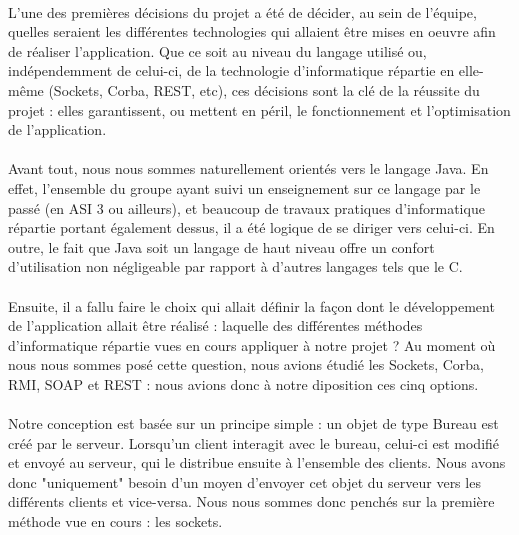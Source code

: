 \paragraph{}
L'une des premières décisions du projet a été de décider, au sein de l'équipe, quelles seraient les différentes technologies qui allaient être mises en oeuvre afin de réaliser l'application. Que ce soit au niveau du langage utilisé ou, indépendemment de celui-ci, de la technologie d'informatique répartie en elle-même (Sockets, Corba, REST, etc), ces décisions sont la clé de la réussite du projet : elles garantissent, ou mettent en péril, le fonctionnement et l'optimisation de l'application.

\paragraph{}
Avant tout, nous nous sommes naturellement orientés vers le langage Java. En effet, l'ensemble du groupe ayant suivi un enseignement sur ce langage par le passé (en ASI 3 ou ailleurs), et beaucoup de travaux pratiques d'informatique répartie portant également dessus, il a été logique de se diriger vers celui-ci. En outre, le fait que Java soit un langage de haut niveau offre un confort d'utilisation non négligeable par rapport à d'autres langages tels que le C.

\paragraph{}
Ensuite, il a fallu faire le choix qui allait définir la façon dont le développement de l'application allait être réalisé : laquelle des différentes méthodes d'informatique répartie vues en cours appliquer à notre projet ? Au moment où nous nous sommes posé cette question, nous avions étudié les Sockets, Corba, RMI, SOAP et REST : nous avions donc à notre diposition ces cinq options.

\paragraph{}
Notre conception est basée sur un principe simple : un objet de type Bureau est créé par le serveur. Lorsqu'un client interagit avec le bureau, celui-ci est modifié et envoyé au serveur, qui le distribue ensuite à l'ensemble des clients. Nous avons donc "uniquement" besoin d'un moyen d'envoyer cet objet du serveur vers les différents clients et vice-versa. Nous nous sommes donc penchés sur la première méthode vue en cours : les sockets.

